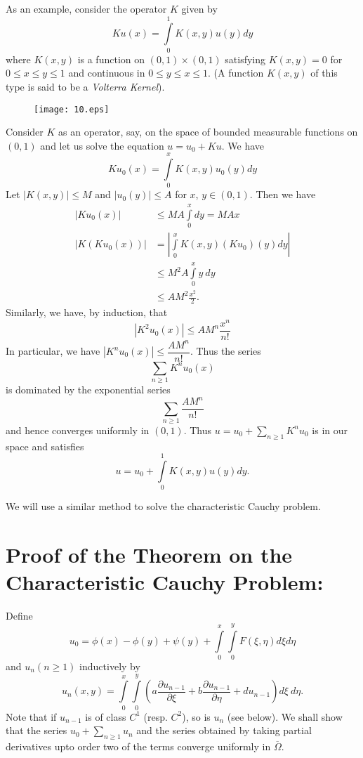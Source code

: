 As an example, consider the operator $K$ given by 
$$
Ku(x)=\int\limits^{1}_{0}K(x,y)u(y)dy
$$
where $K(x,y)$ is a function on $(0,1)\times (0,1)$ satisfying $K(x,y)=0$ for $0\leq x\leq y\leq 1$ and continuous in $0\leq y\leq x\leq 1$. (A function $K(x,y)$ of this type is said to be a {\em Volterra Kernel}).
\begin{figure}[H]
\centering
\texttt{[image: 10.eps]}
\end{figure}
\noindent
Consider $K$ as an operator, say, on the space of bounded measurable functions on $(0,1)$ and let us solve the equation $u=u_{0}+Ku$. We have
$$
Ku_{0}(x)=\int\limits^{x}_{0}K(x,y)u_{0}(y)dy
$$
Let $|K(x,y)|\leq M$ and $|u_{0}(y)|\leq A$ for $x$, $y\in (0,1)$. Then we have
\begin{align*}
|Ku_{0}(x)| &\leq MA \int\limits^{x}_{0}dy=MAx\\[3pt]
|K(Ku_{0}(x))| &= |\int\limits^{x}_{0}K(x,y)(Ku_{0})(y)dy|\\[3pt]
&\leq M^{2}A\int\limits^{x}_{0}y \ dy\\[3pt]
&\leq AM^{2}\frac{x^{2}}{2}.
\end{align*}\pageoriginale
Similarly, we have, by induction, that
$$
|K^{2}u_{0}(x)|\leq AM^{n}\dfrac{x^{n}}{n!}
$$
In particular, we have $|K^{n}u_{0}(x)|\leq \dfrac{AM^{n}}{n!}$. Thus the series
$$
\sum\limits_{n\geq 1} K^{n}u_{0}(x)
$$
is dominated by the exponential series
$$
\sum\limits_{n\geq 1} \dfrac{AM^{n}}{n!}
$$
and hence converges uniformly in $(0,1)$. Thus $u=u_{0}+\sum\limits_{n\geq 1}K^{n}u_{0}$ is in our space and satisfies
$$
u=u_{0}+\int\limits^{1}_{0}K(x,y)u(y)dy.
$$

We will use a similar method to solve the characteristic Cauchy problem.

\section*{Proof of the Theorem on the Characteristic Cauchy Problem:}

Define
$$
u_{0}=\phi(x)-\phi(y)+\psi(y)+\int\limits^{x}_{0}\int\limits^{y}_{0}F(\xi,\eta)d\xi d\eta
$$
and $u_{n}(n\geq 1)$ inductively by
$$
u_{n}(x,y)=\int\limits^{x}_{0}\int\limits^{y}_{0}\left(a\frac{\partial u_{n-1}}{\partial \xi}+b\dfrac{\partial u_{n-1}}{\partial \eta}+du_{n-1}\right)d\xi \ d\eta.
$$\pageoriginale
Note that if $u_{n-1}$ is of class $C^{1}$ (resp. $C^{2}$), so is $u_{n}$ (see below). We shall show that the series $u_{0}+\sum\limits_{n\geq 1}u_{n}$ and the series obtained by taking partial derivatives upto order two of the terms converge uniformly in $\overline{\Omega}$.


